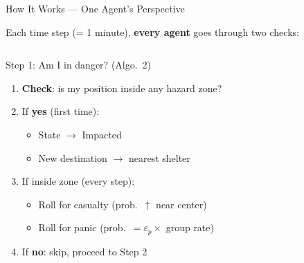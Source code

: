 \documentclass[aspectratio=169, xcolor=table]{beamer}
\begin{document}
\begin{frame}[t,shrink=5]{How It Works --- One Agent's Perspective}
\footnotesize

Each time step (= 1 minute), \textbf{every agent} goes through two checks:

\vspace{0.3em}
\begin{columns}[T,onlytextwidth]
\begin{alertblock}{\small Step 1: Am I in danger? \normalsize\textcolor{highlightred}{(Algo.\ 2)}}
\scriptsize
\begin{enumerate}\itemsep0.3em
  \item \textbf{Check}: is my position inside any hazard zone?
  \item If \textbf{yes} (first time):
    \begin{itemize}\itemsep0.1em
      \item[$\circ$] State $\to$ \textcolor{stateimpacted}{Impacted}
      \item[$\circ$] New destination $\to$ nearest shelter
    \end{itemize}
  \item If inside zone (every step):
    \begin{itemize}\itemsep0.1em
      \item[$\circ$] Roll for \textcolor{statecasualty}{casualty} (prob.\ $\uparrow$ near center)
      \item[$\circ$] Roll for \textcolor{highlightred}{panic} (prob.\ $= \varepsilon_p \times$ group rate)
    \end{itemize}
  \item If \textbf{no}: skip, proceed to Step 2
\end{enumerate}
\end{alertblock}


\end{columns}
\end{frame}
\end{document}

